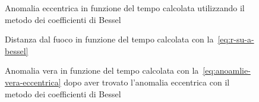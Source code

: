 \begin{figure}
  \centering
  
  \caption[Anomalia eccentrica in funzione del tempo con il metodo dei
  coefficienti di Bessel]{Anomalia eccentrica in funzione del tempo calcolata
    utilizzando il metodo dei coefficienti di Bessel}
  \label{fig:bessel-anomalia_eccentrica}
\end{figure}
\begin{figure}
  \centering
  
  \caption[Distanza dal fuoco in funzione del tempo con il metodo dei
  coefficienti di Bessel]{Distanza dal fuoco in funzione del tempo calcolata con
    la~\eqref{eq:r-su-a-bessel}}
  \label{fig:bessel-raggio}
\end{figure}
\begin{figure}
  \centering
  
  \caption[Anomalia vera in funzione del tempo con il metodo dei coefficienti di
  Bessel]{Anomalia vera in funzione del tempo calcolata con
    la~\eqref{eq:anoamlie-vera-eccentrica} dopo aver trovato l'anomalia
    eccentrica con il metodo dei coefficienti di Bessel}
  \label{fig:bessel-anomalia_vera}
\end{figure}

